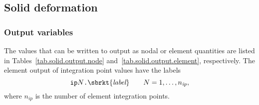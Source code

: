 
\subsection{Solid deformation}

\subsubsection{Output variables}
The values that can be written to output as nodal or element 
quantities are listed in Tables~\ref{tab.solid.output.node} 
and~\ref{tab.solid.output.element}, respectively. The element output 
of integration point values have the labels
\[
\texttt{ip}N\texttt{.}\sbrkt{\textit{label}} \qquad
N=1,\ldots,n_{\textit{ip}},
\]
where $n_{\textit{ip}}$ is the number of element integration points.

